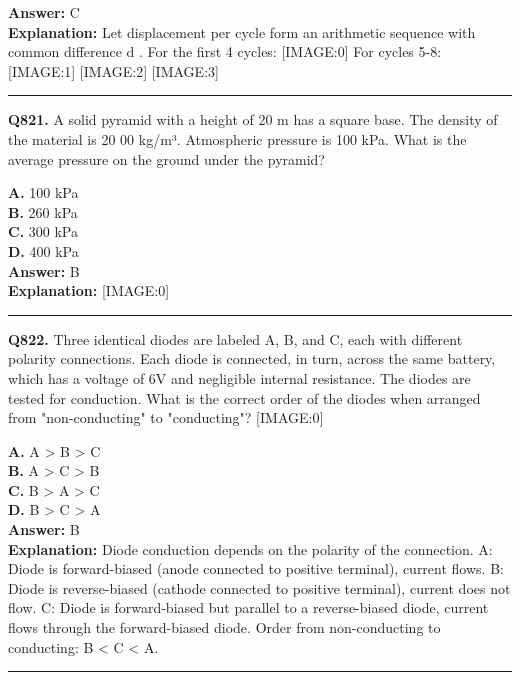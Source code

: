\documentclass[12pt]{article}
\begin{document}
\textbf{Answer:} C \\
\textbf{Explanation:} Let displacement per cycle form an arithmetic sequence with common difference
d
.
For the first 4 cycles:
[IMAGE:0]
For cycles 5-8:
[IMAGE:1]
[IMAGE:2]
[IMAGE:3]

\hrule
\vspace{1em}


\noindent
\textbf{Q821.} A solid pyramid with a height of 20 m has a square base. The density of the material is
20
00 kg/m³. Atmospheric pressure is 100 kPa. What is the average pressure on the ground under the pyramid?



\textbf{A.} 100 kPa \\
\textbf{B.} 260
kPa \\
\textbf{C.} 300 kPa \\
\textbf{D.} 400 kPa \\

\textbf{Answer:} B \\
\textbf{Explanation:} [IMAGE:0]

\hrule
\vspace{1em}


\noindent
\textbf{Q822.} Three identical diodes are labeled A, B, and C, each with different polarity connections. Each diode is connected, in turn, across the same battery, which has a voltage of 6V and negligible internal resistance. The diodes are tested for conduction. What is the correct order of the diodes when arranged from "non-conducting" to "conducting"?
[IMAGE:0]



\textbf{A.} A
>
B
>
C \\
\textbf{B.} A
>
C
>
B \\
\textbf{C.} B
>
A
>
C \\
\textbf{D.} B
>
C
>
A \\

\textbf{Answer:} B \\
\textbf{Explanation:} Diode conduction depends on the polarity of the connection.
\cdot 
A: Diode is forward-biased (anode connected to positive terminal), current flows.
\cdot 
B: Diode is reverse-biased (cathode connected to positive terminal), current does not flow.
\cdot 
C: Diode is forward-biased but parallel to a reverse-biased diode, current flows through the forward-biased diode.
Order from non-conducting to conducting: B < C < A.

\hrule
\vspace{1em}
\end{document}
